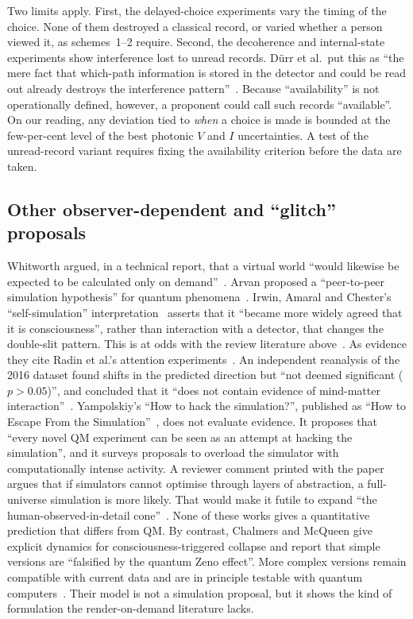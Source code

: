 Two limits apply. First, the delayed-choice experiments vary the timing of the
choice. None of them destroyed a classical record, or varied whether a person
viewed it, as schemes~1--2 require. Second, the decoherence and internal-state
experiments show interference lost to unread records. D\"urr et al.\ put this
as ``the mere fact that which-path information is stored in the detector and
could be read out already destroys the interference
pattern''~\cite[Sec.~IV.B]{Ma2016delayed}. Because ``availability'' is not
operationally defined, however, a proponent could call such records
``available''. On our reading, any deviation tied to \emph{when} a choice is
made is bounded at the few-per-cent level of the best photonic $V$ and $I$
uncertainties. A test of the unread-record variant requires fixing the
availability criterion before the data are taken.

\subsection{Other observer-dependent and ``glitch'' proposals}
\label{sec:rendering-qm-others}

Whitworth argued, in a technical report, that a virtual world ``would likewise
be expected to be calculated only on demand''~\cite{Whitworth2008physical}.
Arvan proposed a ``peer-to-peer simulation hypothesis'' for quantum
phenomena~\cite{Arvan2014unified}. Irwin, Amaral and Chester's
``self-simulation'' interpretation~\cite{Irwin2020self} asserts that it
``became more widely agreed that it is consciousness'', rather than interaction
with a detector, that changes the double-slit pattern. This is at odds with the
review literature above~\cite{Ma2016delayed}. As evidence they cite Radin et
al.'s attention experiments~\cite{Radin2016psychophysical}. An independent
reanalysis of the 2016 dataset found shifts in the predicted direction but ``not
deemed significant ($p>0.05$)'', and concluded that it ``does not contain
evidence of mind-matter interaction''~\cite{Tremblay2019independent}.
Yampolskiy's ``How to hack the simulation?'', published as ``How to Escape From
the Simulation''~\cite{Yampolskiy2023how}, does not evaluate evidence. It
proposes that ``every novel QM experiment can be seen as an attempt at hacking
the simulation'', and it surveys proposals to overload the simulator with
computationally intense activity. A reviewer comment printed with the paper
argues that if simulators cannot optimise through layers of abstraction, a
full-universe simulation is more likely. That would make it futile to expand
``the human-observed-in-detail cone''~\cite{Yampolskiy2023how}. None of
these works gives a quantitative prediction that differs from QM. By contrast, Chalmers and McQueen give explicit dynamics for
consciousness-triggered collapse and report that simple versions are
``falsified by the quantum Zeno effect''. More complex versions remain
compatible with current data and are in principle testable with quantum
computers~\cite{Chalmers2022consciousness}. Their model is not a simulation
proposal, but it shows the kind of formulation the render-on-demand literature
lacks.

